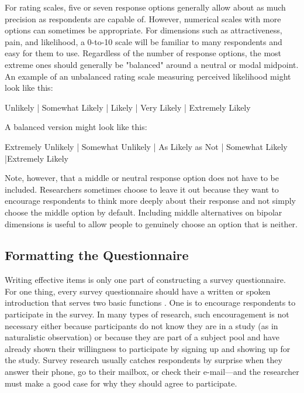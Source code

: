 For rating scales, five or seven response options generally allow about as much precision as respondents are capable of. However, numerical scales with more options can sometimes be appropriate. For dimensions such as attractiveness, pain, and likelihood, a 0-to-10 scale will be familiar to many respondents and easy for them to use. Regardless of the number of response options, the most extreme ones should generally be "balanced" around a neutral or modal midpoint. An example of an unbalanced rating scale measuring perceived likelihood might look like this:

\color{fgcolor}\begin{kframe}
Unlikely | Somewhat Likely | Likely | Very Likely | Extremely Likely
\end{kframe}

A balanced version might look like this:

\color{fgcolor}\begin{kframe}
Extremely Unlikely | Somewhat Unlikely | As Likely as Not | Somewhat Likely |Extremely Likely
\end{kframe}


Note, however, that a middle or neutral response option does not have to be included. Researchers sometimes choose to leave it out because they want to encourage respondents to think more deeply about their response and not simply choose the middle option by default. Including middle alternatives on bipolar dimensions is useful to allow people to genuinely choose an option that is neither.

\subsection{Formatting the Questionnaire}

Writing effective items is only one part of constructing a survey questionnaire. For one thing, every survey questionnaire should have a written or spoken introduction that serves two basic functions \citep{peterson_constructing_2000}. One is to encourage respondents to participate in the survey. In many types of research, such encouragement is not necessary either because participants do not know they are in a study (as in naturalistic observation) or because they are part of a subject pool and have already shown their willingness to participate by signing up and showing up for the study. Survey research usually catches respondents by surprise when they answer their phone, go to their mailbox, or check their e-mail---and the researcher must make a good case for why they should agree to participate.

